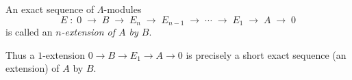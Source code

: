 An exact sequence of $\Lambda$-modules
$$
E \;:\; 0 \;\longrightarrow\; B \;\longrightarrow\; E_n \;\longrightarrow\; E_{n-1} \;\longrightarrow\; \cdots \;\longrightarrow\; E_1 \;\longrightarrow\; A \;\longrightarrow\; 0
$$
is called an {\em $n$-extension of $A$ by $B$}.

Thus a $1$-extension $0 \to B \to E_1 \to A \to 0$ is precisely a short exact sequence (an extension) of $A$ by $B$.
